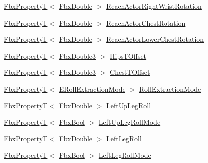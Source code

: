\begin{DoxyCompactItemize}
\item 
\hyperlink{class_fbx_property_t}{Fbx\+PropertyT}$<$ \hyperlink{fbxtypes_8h_a171e72a1c46fc15c1a6c9c31948c1c5b}{Fbx\+Double} $>$ \hyperlink{class_fbx_character_aa53997798ecc3efe6447dc4bef4de1a4}{Reach\+Actor\+Right\+Wrist\+Rotation}
\item 
\hyperlink{class_fbx_property_t}{Fbx\+PropertyT}$<$ \hyperlink{fbxtypes_8h_a171e72a1c46fc15c1a6c9c31948c1c5b}{Fbx\+Double} $>$ \hyperlink{class_fbx_character_a448705b8ffd45a455d42c9eb5be13260}{Reach\+Actor\+Chest\+Rotation}
\item 
\hyperlink{class_fbx_property_t}{Fbx\+PropertyT}$<$ \hyperlink{fbxtypes_8h_a171e72a1c46fc15c1a6c9c31948c1c5b}{Fbx\+Double} $>$ \hyperlink{class_fbx_character_a1c9c043f80be7d8e7ce15b67d8e66239}{Reach\+Actor\+Lower\+Chest\+Rotation}
\item 
\hyperlink{class_fbx_property_t}{Fbx\+PropertyT}$<$ \hyperlink{fbxtypes_8h_ae0a96f14cde566774c7553aa7523b7a7}{Fbx\+Double3} $>$ \hyperlink{class_fbx_character_af57834880f8f20bbb4c6eb241413be98}{Hips\+T\+Offset}
\item 
\hyperlink{class_fbx_property_t}{Fbx\+PropertyT}$<$ \hyperlink{fbxtypes_8h_ae0a96f14cde566774c7553aa7523b7a7}{Fbx\+Double3} $>$ \hyperlink{class_fbx_character_add78528e2f4e980a41a4b6e2a03ff32d}{Chest\+T\+Offset}
\item 
\hyperlink{class_fbx_property_t}{Fbx\+PropertyT}$<$ \hyperlink{class_fbx_character_af25b0a8483d9c3da279a60dd3a9a388e}{E\+Roll\+Extraction\+Mode} $>$ \hyperlink{class_fbx_character_aabd9d78eb10d7a77fe7902fc94a19cb6}{Roll\+Extraction\+Mode}
\item 
\hyperlink{class_fbx_property_t}{Fbx\+PropertyT}$<$ \hyperlink{fbxtypes_8h_a171e72a1c46fc15c1a6c9c31948c1c5b}{Fbx\+Double} $>$ \hyperlink{class_fbx_character_a662864f5da2b33658f85ae9826b0e3f0}{Left\+Up\+Leg\+Roll}
\item 
\hyperlink{class_fbx_property_t}{Fbx\+PropertyT}$<$ \hyperlink{fbxtypes_8h_a92e0562b2fe33e76a242f498b362262e}{Fbx\+Bool} $>$ \hyperlink{class_fbx_character_a84a8c860549c7a6ae3f2c38535286501}{Left\+Up\+Leg\+Roll\+Mode}
\item 
\hyperlink{class_fbx_property_t}{Fbx\+PropertyT}$<$ \hyperlink{fbxtypes_8h_a171e72a1c46fc15c1a6c9c31948c1c5b}{Fbx\+Double} $>$ \hyperlink{class_fbx_character_a8102d99e903d36ea2e3ae8cf24ec400d}{Left\+Leg\+Roll}
\item 
\hyperlink{class_fbx_property_t}{Fbx\+PropertyT}$<$ \hyperlink{fbxtypes_8h_a92e0562b2fe33e76a242f498b362262e}{Fbx\+Bool} $>$ \hyperlink{class_fbx_character_a59f7269d313c5482bfcb2fd7daa592c3}{Left\+Leg\+Roll\+Mode}

\end{DoxyCompactItemize}
